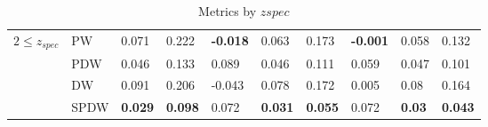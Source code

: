 \documentclass[fleqn,usenatbib]{mnras}
\begin{document}
\begin{table}
\begin{tabular}{llllllllll}
\hline
            $2 \leq z_{spec}$ & PW &                0.071 &           0.222 &  \textbf{-0.018} &            0.063 &           0.173 &  \textbf{-0.001} &            0.058 &           0.132 \\
                              & PDW &                0.046 &           0.133 &            0.089 &            0.046 &           0.111 &            0.059 &            0.047 &           0.101 \\
                              & DW &                0.091 &           0.206 &           -0.043 &            0.078 &           0.172 &            0.005 &             0.08 &           0.164 \\
                              & SPDW &       \textbf{0.029} &  \textbf{0.098} &            0.072 &   \textbf{0.031} &  \textbf{0.055} &            0.072 &    \textbf{0.03} &  \textbf{0.043} \\
\hline
            \hline
            \end{tabular}
            \caption{Metrics by $zspec$}
\end{table}
\end{document}
